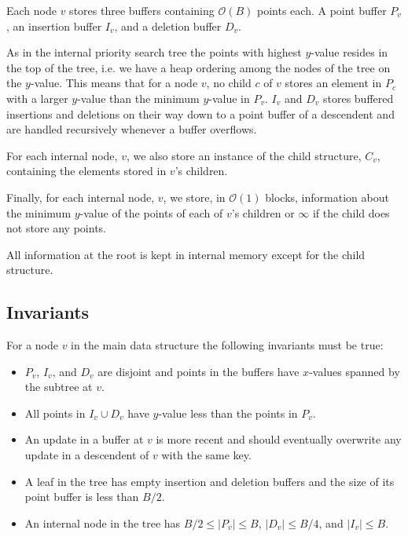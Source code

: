 \documentclass[twoside,11pt,openright]{report}
\begin{document}
Each node $v$ stores three buffers containing $\mathcal{O}(B)$ points each. A point buffer $P_v$, an insertion buffer $I_v$, and a deletion buffer $D_v$.

As in the internal priority search tree the points with highest $y$-value resides in the top of the tree, i.e. we have a heap ordering among the nodes of the tree on the $y$-value. This means that for a node $v$, no child $c$ of $v$ stores an element in $P_c$ with a larger $y$-value than the minimum $y$-value in $P_v$.
$I_v$ and $D_v$ stores buffered insertions and deletions on their way down to a point buffer of a descendent and are handled recursively whenever a buffer overflows.

For each internal node, $v$, we also store an instance of the child structure, $C_v$, containing the elements stored in $v$'s children.

Finally, for each internal node, $v$, we store, in $\mathcal{O}(1)$ blocks, information about the minimum $y$-value of the points of each of $v$'s children or $\infty$ if the child does not store any points.

All information at the root is kept in internal memory except for the child structure.

\subsection{Invariants}
For a node $v$ in the main data structure the following invariants must be true:
\begin{itemize}
	\item $P_v$, $I_v$, and $D_v$ are disjoint and points in the buffers have $x$-values spanned by the subtree at $v$.
	\item All points in $I_v \cup D_v$ have $y$-value less than the points in $P_v$.
	\item An update in a buffer at $v$ is more recent and should eventually overwrite any update in a descendent of $v$ with the same key.
	\item A leaf in the tree has empty insertion and deletion buffers and the size of its point buffer is less than $B/2$.
	\item An internal node in the tree has $B/2 \leq \vert P_v \vert \leq B$, $\vert D_v \vert \leq B/4$, and $\vert I_v \vert \leq B$.
\end{itemize}
\end{document}

